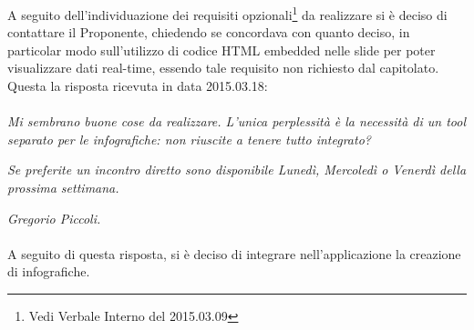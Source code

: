 A seguito dell'individuazione dei requisiti opzionali\footnote{Vedi \gls{Verbale} Interno del 2015.03.09} da realizzare si è deciso di contattare il Proponente, chiedendo se concordava con quanto deciso, in particolar modo sull'utilizzo di codice HTML embedded nelle slide per poter visualizzare dati real-time, essendo tale requisito non richiesto dal capitolato. Questa la risposta ricevuta in data 2015.03.18:

\paragraph{}
\textit{Mi sembrano buone cose da realizzare. L'unica perplessità è la necessità di un tool separato per le infografiche: non riuscite a tenere tutto integrato?} 
	
\noindent \textit{Se preferite un incontro diretto sono disponibile Lunedì, Mercoledì o Venerdì della prossima settimana.}

\noindent \textit{Gregorio Piccoli.}

\paragraph{}
\noindent A seguito di questa risposta, si è deciso di integrare nell'applicazione la creazione di infografiche.

